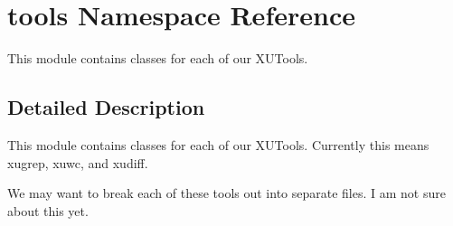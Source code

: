 \hypertarget{namespacetools}{\section{tools Namespace Reference}
\label{namespacetools}
}


This module contains classes for each of our X\-U\-Tools.  




\subsection{Detailed Description}
This module contains classes for each of our X\-U\-Tools. Currently this means xugrep, xuwc, and xudiff.

We may want to break each of these tools out into separate files. I am not sure about this yet. 